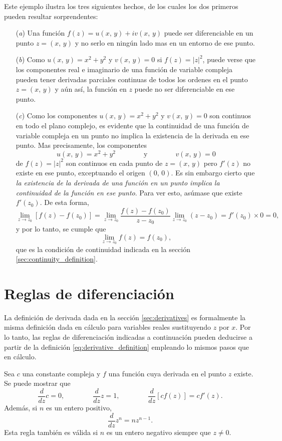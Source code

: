 \documentclass[a4paper]{report}
\begin{document}
Este ejemplo ilustra los tres siguientes hechos, de los cuales los dos primeros pueden resultar sorprendentes:
\begin{enumerate}
 \item[(\textit{a})] Una función \(f(z)=u(x,\,y)+iv(x,\,y)\) puede ser diferenciable en un punto \(z=(x,\,y)\) y no serlo en ningún lado mas en un entorno de ese punto.
 \item[(\textit{b})] Como \(u(x,\,y)=x^2+y^2\) y \(v(x,\,y)=0\) si \(f(z)=|z|^2\), puede verse que los componentes real e imaginario de una función de variable compleja pueden tener derivadas parciales continuas de todos los ordenes en el punto \(z=(x,\,y)\) y aún así, la función en \(z\) puede no ser diferenciable en ese punto.
 \item[(\textit{c})] Como los componentes \(u(x,\,y)=x^2+y^2\) y \(v(x,\,y)=0\) son continuos en todo el plano complejo, es evidente que la continuidad de una función de variable compleja en un punto no implica la existencia de la derivada en ese punto. Mas precisamente, los componentes
 \[
  u(x,\,y)=x^2+y^2\qquad\qquad\textrm{y}\qquad\qquad v(x,\,y)=0
 \]
 de \(f(z)=|z|^2\) son continuos en cada punto de \(z=(x,\,y)\) pero \(f'(z)\) no existe en ese punto, exceptuando el origen \((0,\,0)\). Es sin embargo cierto que \emph{la existencia de la derivada de una función en un punto implica la continuidad de la función en ese punto}. Para ver esto, asúmase que existe \(f'(z_0)\). De esta forma,
 \[
  \lim_{z\to z_0}[f(z)-f(z_0)]=\lim_{z\to z_0}\frac{f(z)-f(z_0)}{z-z_0}\lim_{z\to z_0}(z-z_0)
  =f'(z_0)\times 0=0,
 \]
 y por lo tanto, se cumple que 
 \[
  \lim_{z\to z_0}f(z)=f(z_0),
 \]
 que es la condición de continuidad indicada en la sección \ref{sec:continuity_definition}.
\end{enumerate}

\section{Reglas de diferenciación}\label{sec:differentiation_rules}

La definición de derivada dada en la sección \ref{sec:derivatives} es formalmente la misma definición dada en cálculo para variables reales sustituyendo \(z\) por \(x\). Por lo tanto, las reglas de diferenciación indicadas a continuación pueden deducirse a partir de la definición \ref{eq:derivative_definition} empleando lo mismos pasos que en cálculo.

Sea \(c\) una constante compleja y \(f\) una función cuya derivada en el punto \(z\) existe. Se puede mostrar que 
\[
 \frac{d}{dz}c=0,\qquad\qquad
 \frac{d}{dz}z=1,\qquad\qquad
 \frac{d}{dz}[cf(z)]=cf'(z).
\]
Además, si \(n\) es un entero positivo,
\begin{equation}\label{eq:derivative_of_z_exp_n}
  \frac{d}{dz}z^n=nz^{n-1}.
\end{equation}
Esta regla también es válida si \(n\) es un entero negativo siempre que \(z\neq0\).
\end{document}
